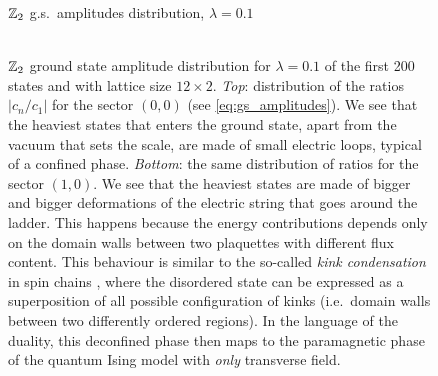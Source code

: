 \begin{figure}[h]
    \centering
    \hspace{3em}$\mathbb{Z}_2$ g.s.~amplitudes distribution, $\lambda=0.1$ \\[5pt]
    \\[-2pt]\hspace{0.4pt}
    
    \caption{
    $\mathbb{Z}_2$ ground state amplitude distribution for $\lambda=0.1$ of the first 200 states and with lattice size $12 \times 2$.
    \emph{Top}: distribution of the ratios $|{c_n/c_1}|$ for the sector $(0,0)$ (see \eqref{eq:gs_amplitudes}).
    We see that the heaviest states that enters the ground state, apart from the vacuum that sets the scale, are made of small electric loops, typical of a confined phase.
    \emph{Bottom}: the same distribution of ratios for the sector $(1,0)$.
    We see that the heaviest states are made of bigger and bigger deformations of the electric string that goes around the ladder.
    This happens because the energy contributions depends only on the domain walls between two plaquettes with different flux content.
    This behaviour is similar to the so-called \emph{kink condensation} in spin chains \cite{fradkin1978order}, where the disordered state can be expressed as a superposition of all possible configuration of kinks (i.e.~domain walls between two differently ordered regions).
    In the language of the duality, this deconfined phase then maps to the paramagnetic phase of the quantum Ising model with \emph{only} transverse field.
    }
    \label{fig:gs_ampl_distr_0.1_Z2}
\end{figure}



